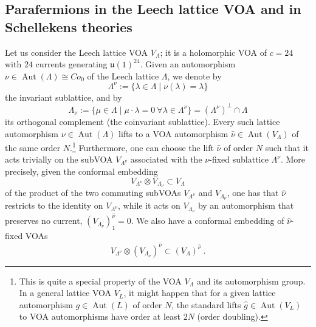 \documentclass[11pt,reqno]{article}
\newcommand{\be}{\begin{equation}}
\newcommand{\ee}{\end{equation}}
\DeclareMathOperator{\Aut}{Aut}
\newcommand{\alg}[1]{\mathfrak{#1}}
\begin{document}
\subsection{Parafermions in the Leech lattice VOA and in Schellekens theories}\label{s:paraLeech}

Let us consider the Leech lattice VOA $V_\Lambda$; it is a holomorphic VOA of $c=24$ with $24$ currents generating $\alg{u}(1)^{24}$.  Given an automorphism $\nu\in \Aut(\Lambda)\cong Co_0$ of the Leech lattice $\Lambda$, we denote by
\be \Lambda^\nu:=\{\lambda\in \Lambda\mid \nu(\lambda)=\lambda\}
\ee the invariant sublattice, and by
\be \Lambda_\nu:=\{\mu\in \Lambda\mid \mu\cdot \lambda=0\ \forall \lambda\in \Lambda^\nu\}=(\Lambda^\nu)^\perp\cap \Lambda
\ee its orthogonal complement (the coinvariant sublattice).
Every such lattice automorphism $\nu\in \Aut(\Lambda)$ lifts to a VOA automorphism $\hat \nu\in \Aut(V_\Lambda)$ of the same order $N$.\footnote{This is quite a special property of the VOA $V_\Lambda$ and its automorphism group. In a general lattice VOA $V_L$, it might happen that for a given lattice automorphism $g\in \Aut(L)$ of order $N$, the standard lifts $\hat g\in \Aut(V_L)$ to VOA automorphisms have order at least $2N$ (order doubling).} Furthermore, one can choose the lift $\hat \nu$ of order $N$ such that it acts trivially on the subVOA $V_{\Lambda^\nu}$ associated with the $\nu$-fixed sublattice $\Lambda^\nu$. 
More precisely, given the conformal embedding \be V_{\Lambda^\nu}\otimes V_{\Lambda_\nu} \subset V_\Lambda\ee of the product of the two commuting subVOAs $V_{\Lambda^\nu}$ and $V_{\Lambda_\nu}$, one has that $\hat \nu$ restricts to the identity on $V_{\Lambda^\nu}$, while it acts on $V_{\Lambda_\nu}$ by an automorphism that preserves no current, $(V_{\Lambda_\nu})^{\hat\nu}_1=0$. We also have a conformal embedding of $\hat\nu$-fixed VOAs
\be\label{hatnuembed} V_{\Lambda^\nu}\otimes (V_{\Lambda_\nu})^{\hat\nu} \subset (V_\Lambda)^{\hat\nu}\ .
\ee 
\end{document}
